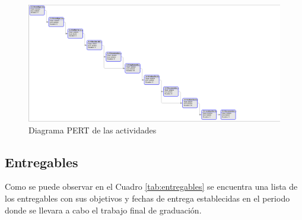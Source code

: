 \documentclass[12pt]{article}
\begin{document}
\begin{figure}
  \centering
  \includegraphics[scale=0.3, angle=90]{diagramas/pert.png}
  \caption{Diagrama PERT de las actividades}
  \label{fig:pert}
\end{figure}


\subsection{Entregables}

Como se puede observar en el Cuadro \ref{tab:entregables} se encuentra una lista de los entregables con sus objetivos y fechas de entrega establecidas en el periodo donde se llevara a cabo el trabajo final de graduación.
\end{document}
